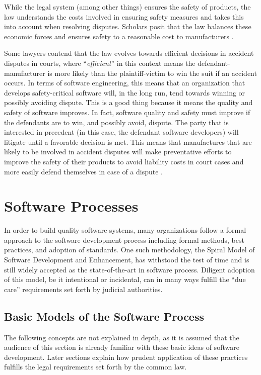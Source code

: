 \documentclass[12pt]{report}
\begin{document}
While the legal system (among other things) ensures the safety of products, the law understands the costs involved in ensuring safety measures and takes this into account when resolving disputes. Scholars posit that the law balances these economic forces and ensures safety to a reasonable cost to manufacturers \cite{FAKE}.

Some lawyers contend that the law evolves towards efficient decisions in accident disputes in courts, where ``\textit{efficient}'' in this context means the defendant-manufacturer is more likely than the plaintiff-victim to win the suit if an accident occurs. In terms of software engineering, this means that an organization that develops safety-critical software will, in the long run, tend towards winning or possibly avoiding dispute. This is a good thing because it means the quality and safety of software improves. In fact, software quality and safety must improve if the defendants are to win, and possibly avoid, dispute. The party that is interested in precedent (in this case, the defendant software developers) will litigate until a favorable decision is met. This means that manufactures that are likely to be involved in accident disputes will make preventative efforts to improve the safety of their products to avoid liability costs in court cases and more easily defend themselves in case of a dispute \cite{FAKE}.

\chapter{Software Processes} 
In order to build quality software systems, many organizations follow a formal approach to the software development process including formal methods, best practices, and adoption of standards. One such methodology, the Spiral Model of Software Development and Enhancement, has withstood the test of time and is still widely accepted as the state-of-the-art in software process. Diligent adoption of this model, be it intentional or incidental, can in many ways fulfill the ``due care'' requirements set forth by judicial authorities. 

\section{Basic Models of the Software Process} 
The following concepts are not explained in depth, as it is assumed that the audience of this section is already familiar with these basic ideas of software development. Later sections explain how prudent application of these practices fulfills the legal requirements set forth by the common law. 
\end{document}
